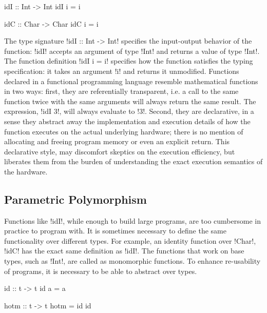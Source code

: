 \documentclass[screen,nonacm,manuscript,review]{acmart} %
\begin{document}
\begin{minipage}{0.5\linewidth}
\begin{CenteredBox}
\begin{code}
idI :: Int -> Int
idI i = i
\end{code}
\end{CenteredBox}
\end{minipage}%
\begin{minipage}{0.5\linewidth}
\begin{CenteredBox}
\begin{code}
idC :: Char -> Char
idC i = i
\end{code}
\end{CenteredBox}
\end{minipage}

The type signature !idI :: Int -> Int! specifies the input-output behavior of the
function: !idI! accepts an argument of type !Int! and returns a value of type !Int!. The
function definition !idI i = i! specifies how the function satisfies the typing
specification: it takes an argument !i! and returns it unmodified. Functions declared in a
functional programming language resemble mathematical functions in two ways: first, they
are referentially transparent, i.e. a call to the same function twice with the same
arguments will always return the same result. The expression, !idI 3!, will always
evaluate to !3!. Second, they are declarative, in a sense they abstract away the
implementation and execution details of how the function executes on the actual underlying
hardware; there is no mention of allocating and freeing program memory or even an explicit
return. This declarative style, may discomfort skeptics on the execution efficiency, but
liberates them from the burden of understanding the exact execution semantics of the
hardware.

\subsection{Parametric Polymorphism}
Functions like !idI!, while enough to build large programs, are too cumbersome in
practice to program with. It is sometimes necessary to define the same functionality over
different types. For example, an identity function over !Char!, !idC! has the exact same
definition as !idI!. The functions that work on base types, such as !Int!, are called as
monomorphic functions. To enhance re-usability of programs, it is necessary to be able to
abstract over types.


\begin{minipage}{0.5\linewidth}
\begin{CenteredBox}
\begin{code}
id :: t -> t
id a = a
\end{code}
\end{CenteredBox}
\end{minipage}%
\begin{minipage}[ht]{0.5\linewidth}
\begin{CenteredBox}
\begin{code}
hotm :: t -> t
hotm = id id
\end{code}
\end{CenteredBox}
\end{minipage}
\end{document}
